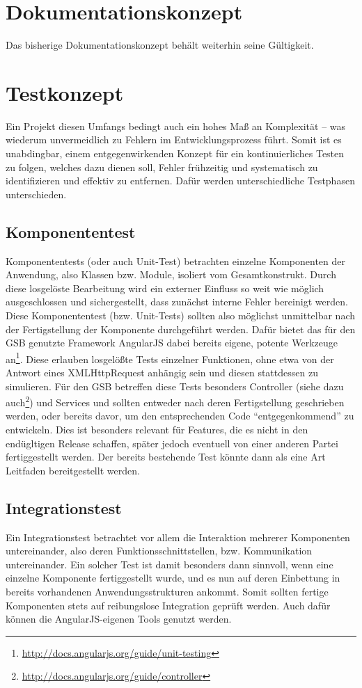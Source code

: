 \section{Dokumentationskonzept}

Das bisherige Dokumentationskonzept behält weiterhin seine Gültigkeit.

\section{Testkonzept }

Ein Projekt diesen Umfangs bedingt auch ein hohes Maß an Komplexität -- was wiederum unvermeidlich zu Fehlern im Entwicklungsprozess führt. Somit ist es unabdingbar, einem entgegenwirkenden Konzept für ein kontinuierliches Testen zu folgen, welches dazu dienen soll, Fehler frühzeitig und systematisch zu identifizieren und effektiv zu entfernen. Dafür werden unterschiedliche Testphasen unterschieden.

\subsection*{Komponententest}
Komponententests (oder auch Unit-Test) betrachten einzelne Komponenten der Anwendung, also Klassen bzw. Module, isoliert vom Gesamtkonstrukt. Durch diese losgelöste Bearbeitung wird ein externer Einfluss so weit wie möglich ausgeschlossen und sichergestellt, dass zunächst interne Fehler bereinigt werden. Diese Komponententest (bzw. Unit-Tests) sollten also möglichst unmittelbar nach der Fertigstellung der Komponente durchgeführt werden. Dafür bietet das für den GSB genutzte Framework AngularJS dabei bereits eigene, potente Werkzeuge an\footnote{\url{http://docs.angularjs.org/guide/unit-testing}}. Diese erlauben losgelößte Tests einzelner Funktionen, ohne etwa von der Antwort eines XMLHttpRequest anhängig sein und diesen stattdessen zu simulieren. Für den GSB betreffen diese Tests besonders Controller (siehe dazu auch\footnote{\url{http://docs.angularjs.org/guide/controller}}) und Services und sollten entweder nach deren Fertigstellung geschrieben werden, oder bereits davor, um den entsprechenden Code “entgegenkommend” zu entwickeln. Dies ist besonders relevant für Features, die es nicht in den endügltigen Release schaffen, später jedoch eventuell von einer anderen Partei fertiggestellt werden. Der bereits bestehende Test könnte dann als eine Art Leitfaden bereitgestellt werden.%

\subsection*{Integrationstest}
Ein Integrationstest betrachtet vor allem die Interaktion mehrerer Komponenten untereinander, also deren Funktionsschnittstellen, bzw. Kommunikation untereinander. Ein solcher Test ist damit besonders dann sinnvoll, wenn eine einzelne Komponente fertiggestellt wurde, und es nun auf deren Einbettung in bereits vorhandenen Anwendungsstrukturen ankommt. Somit sollten fertige Komponenten stets auf reibungslose Integration geprüft werden. Auch dafür können die AngularJS-eigenen Tools genutzt werden.

